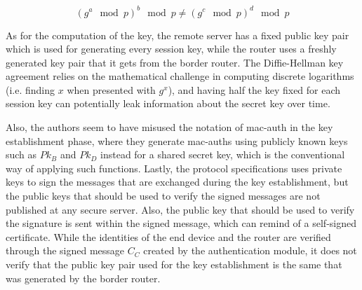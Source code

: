 \begin{equation}
\label{eq:dh-wrong}
(g^a \mod p)^b \mod p \neq (g^c \mod p)^d \mod p
\end{equation}

As for the computation of the key, the remote server has a fixed public key pair which is used for generating every session key, while the router uses a freshly generated key pair that it gets from the border router. The Diffie-Hellman key agreement relies on the mathematical challenge in computing discrete logarithms (i.e. finding $x$ when presented with $g^x$), and having half the key fixed for each session key can potentially leak information about the secret key over time.

Also, the authors seem to have misused the notation of \gls{mac-auth} in the key establishment phase, where they generate \gls{mac-auth}s using publicly known keys such as $Pk_B$ and $Pk_D$ instead for a shared secret key, which is the conventional way of applying such functions. Lastly, the protocol specifications uses private keys to sign the messages that are exchanged during the key establishment, but the public keys that should be used to verify the signed messages are not published at any secure server. Also, the public key that should be used to verify the signature is sent within the signed message, which can remind of a self-signed certificate. While the identities of the end device and the router are verified through the signed message $C_C$ created by the authentication module, it does not verify that the public key pair used for the key establishment is the same that was generated by the border router.

